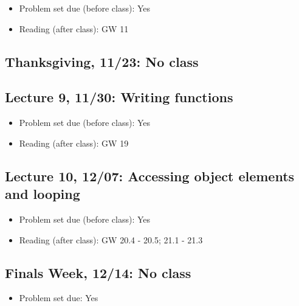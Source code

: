 \documentclass[11pt,]{article}
\providecommand{\tightlist}{%
  \setlength{\itemsep}{0pt}\setlength{\parskip}{0pt}}
\begin{document}
\begin{itemize}
\tightlist
\item
  Problem set due (before class): Yes
\item
  Reading (after class): GW 11
\end{itemize}

\subsection{Thanksgiving, 11/23: No
class}\label{thanksgiving-1123-no-class}

\subsection{Lecture 9, 11/30: Writing
functions}\label{lecture-9-1130-writing-functions}

\begin{itemize}
\tightlist
\item
  Problem set due (before class): Yes
\item
  Reading (after class): GW 19
\end{itemize}

\subsection{Lecture 10, 12/07: Accessing object elements and
looping}\label{lecture-10-1207-accessing-object-elements-and-looping}

\begin{itemize}
\tightlist
\item
  Problem set due (before class): Yes
\item
  Reading (after class): GW 20.4 - 20.5; 21.1 - 21.3
\end{itemize}

\subsection{Finals Week, 12/14: No
class}\label{finals-week-1214-no-class}

\begin{itemize}
\tightlist
\item
  Problem set due: Yes
\end{itemize}
\end{document}
